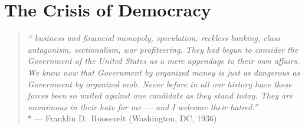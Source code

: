 

\section{The Crisis of Democracy}

\begin{quote}
	\emph{``%
business and financial monopoly, speculation, reckless banking, class antagonism, sectionalism, war profiteering.
	They had begun to consider the Government of the United States as a mere appendage to their own affairs.
We know now that Government by organized money is just as dangerous as Government by organized mob.
Never before in all our history have these forces been so united against one candidate as they stand today.
They are unanimous in their hate for me --- and I welcome their hatred.''}\\*
	--- Franklin D.~Roosevelt (Washington, DC, 1936)
\end{quote}




